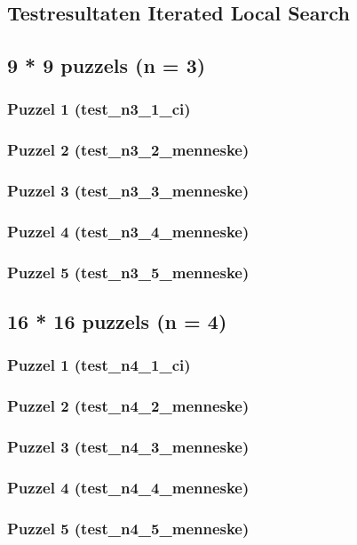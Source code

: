 \documentclass[]{report}
\begin{document}
\begin{appendices}
\chapter{Testresultaten Iterated Local Search}
\section{9 * 9 puzzels (n = 3)}
\subsection{Puzzel 1 (test\_n3\_1\_ci)}

\subsection{Puzzel 2 (test\_n3\_2\_menneske)}
\subsection{Puzzel 3 (test\_n3\_3\_menneske)}
\subsection{Puzzel 4 (test\_n3\_4\_menneske)}
\subsection{Puzzel 5 (test\_n3\_5\_menneske)}
\section{16 * 16 puzzels (n = 4)}
\subsection{Puzzel 1 (test\_n4\_1\_ci)}

\subsection{Puzzel 2 (test\_n4\_2\_menneske)}
\subsection{Puzzel 3 (test\_n4\_3\_menneske)}
\subsection{Puzzel 4 (test\_n4\_4\_menneske)}
\subsection{Puzzel 5 (test\_n4\_5\_menneske)}

\end{appendices}
\end{document}
